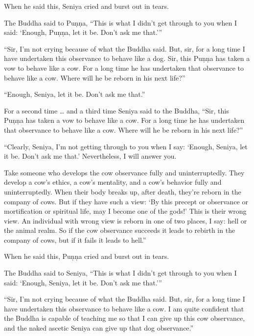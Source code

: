\documentclass[12pt,openany]{book}%
\begin{document}
When he said this, Seniya cried and burst out in tears. 

The Buddha said to \textsanskrit{Puṇṇa}, “This is what I didn’t get through to you when I said: ‘Enough, \textsanskrit{Puṇṇa}, let it be. Don’t ask me that.’” 

“Sir, I’m not crying because of what the Buddha said. But, sir, for a long time I have undertaken this observance to behave like a dog. Sir, this \textsanskrit{Puṇṇa} has taken a vow to behave like a cow. For a long time he has undertaken that observance to behave like a cow. Where will he be reborn in his next life?” 

“Enough, Seniya, let it be. Don’t ask me that.” 

For a second time … and a third time Seniya said to the Buddha, “Sir, this \textsanskrit{Puṇṇa} has taken a vow to behave like a cow. For a long time he has undertaken that observance to behave like a cow. Where will he be reborn in his next life?” 

“Clearly, Seniya, I’m not getting through to you when I say: ‘Enough, Seniya, let it be. Don’t ask me that.’ Nevertheless, I will answer you. 

Take someone who develops the cow observance fully and uninterruptedly. They develop a cow’s ethics, a cow’s mentality, and a cow’s behavior fully and uninterruptedly. When their body breaks up, after death, they’re reborn in the company of cows. But if they have such a view: ‘By this precept or observance or mortification or spiritual life, may I become one of the gods!’ This is their wrong view. An individual with wrong view is reborn in one of two places, I say: hell or the animal realm. So if the cow observance succeeds it leads to rebirth in the company of cows, but if it fails it leads to hell.” 

When he said this, \textsanskrit{Puṇṇa} cried and burst out in tears. 

The Buddha said to Seniya, “This is what I didn’t get through to you when I said: ‘Enough, Seniya, let it be. Don’t ask me that.’” 

“Sir, I’m not crying because of what the Buddha said. But, sir, for a long time I have undertaken this observance to behave like a cow. I am quite confident that the Buddha is capable of teaching me so that I can give up this cow observance, and the naked ascetic Seniya can give up that dog observance.” 
\end{document}
